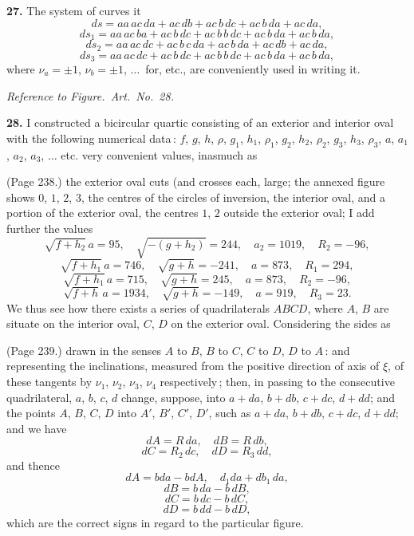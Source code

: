 \documentclass[11pt,a4paper]{book}
\begin{document}
\medskip

\noindent\textbf{27.} The system of curves it
\[
ds = a a\,a c\,d a + a c\,d b + a c\,b\,d c + a c\,b\,d a + a c\,d a,
\]
\[
ds_1 = a a\,a c\,b a + a c\,b\,d c + a c\,b\,b\,d c + a c\,b\,d a + a c\,b\,d a,
\]
\[
ds_2 = a a\,a c\,d c + a c\,b\,c\,d a + a c\,b\,d a + a c\,d b + a c\,d a,
\]
\[
ds_3 = a a\,a c\,d c + a c\,b\,d c + a c\,b\,b\,d c + a c\,b\,d a + a c\,b\,d a,
\]
where $\nu_a = \pm 1$, $\nu_b = \pm 1$, $\ldots$\ for, etc., are conveniently used in writing it.

\medskip

\noindent\textit{Reference to Figure.\ Art.\ No.\ 28.}

\medskip

\noindent\textbf{28.} I constructed a bicircular quartic consisting of an exterior and interior oval with the following numerical data\,: $f$, $g$, $h$, $\rho$, $g_1$, $h_1$, $\rho_1$, $g_2$, $h_2$, $\rho_2$, $g_3$, $h_3$, $\rho_3$, $a$, $a_1$, $a_2$, $a_3$, $\ldots$ etc. very convenient values, inasmuch as

\medskip

\noindent (Page 238.) the exterior oval cuts (and crosses each, large; the annexed figure shows $0$, $1$, $2$, $3$, the centres of the circles of inversion, the interior oval, and a portion of the exterior oval, the centres $1$, $2$ outside the exterior oval; I add further the values
\[
\sqrt{f + h_2}\,a = 95, \quad \sqrt{-( g + h_2)} = 244, \quad a_2 = 1019, \quad R_2 = -96,
\]
\[
\sqrt{f + h_1}\,a = 746, \quad \sqrt{g + h} = -241, \quad a = 873, \quad R_1 = 294,
\]
\[
\sqrt{f + h_1}\,a = 715, \quad \sqrt{g + h} = 245, \quad a = 873, \quad R_2 = -96,
\]
\[
\sqrt{f + h}\,a = 1934, \quad \sqrt{g + h} = -149, \quad a = 919, \quad R_3 = 23.
\]
We thus see how there exists a series of quadrilaterals $ABCD$, where $A$, $B$ are situate on the interior oval, $C$, $D$ on the exterior oval. Considering the sides as

\medskip

\noindent (Page 239.) drawn in the senses $A$ to $B$, $B$ to $C$, $C$ to $D$, $D$ to $A$\,: and representing the inclinations, measured from the positive direction of axis of $\xi$, of these tangents by $\nu_1$, $\nu_2$, $\nu_3$, $\nu_4$ respectively\,; then, in passing to the consecutive quadrilateral, $a$, $b$, $c$, $d$ change, suppose, into $a + da$, $b + db$, $c + dc$, $d + dd$; and the points $A$, $B$, $C$, $D$ into $A'$, $B'$, $C'$, $D'$, such as $a + da$, $b + db$, $c + dc$, $d + dd$; and we have
\[
d A = R\,da, \quad dB = R\,db,
\]
\[
dC = R_2\,dc, \quad d D = R_3\,dd,
\]
and thence
\[
dA = b da - b dA, \quad d_1 d a + db_1\,d a,
\]
\[
dB = b\,da - b\,d B,
\]
\[
dC = b\,dc - b\,d C,
\]
\[
dD = b\,dd - b\,d D,
\]
which are the correct signs in regard to the particular figure.
\end{document}
